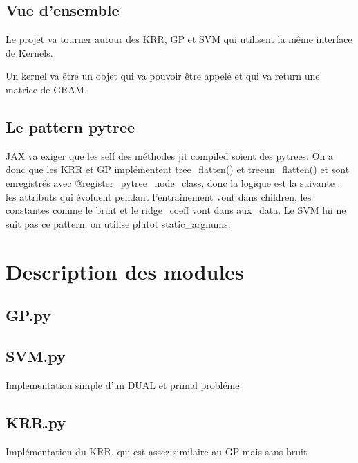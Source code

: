 \documentclass[12pt,a4paper]{report}
\begin{document}
\section{Vue d'ensemble}
Le projet va tourner autour des KRR, GP et SVM qui utilisent la même interface de Kernels.

Un kernel va être un objet qui va pouvoir être appelé et qui va return une matrice de GRAM.
\section{Le pattern pytree}
JAX va exiger que les self des méthodes jit compiled soient des pytrees.
On a donc que les KRR et GP implémentent tree\_flatten() et treeun\_flatten() et sont enregistrés avec
@register\_pytree\_node\_class, donc la logique est la suivante : les attributs qui évoluent pendant l'entrainement
vont dans children, les constantes comme le bruit et le ridge\_coeff vont dans aux\_data.
Le SVM lui ne suit pas ce pattern, on utilise plutot static\_argnums.
\chapter{Description des modules}
\section{GP.py}

\section{SVM.py}
Implementation simple d'un DUAL et primal probléme
\section{KRR.py}
Implémentation du KRR, qui est assez similaire au GP mais sans bruit
\end{document}
